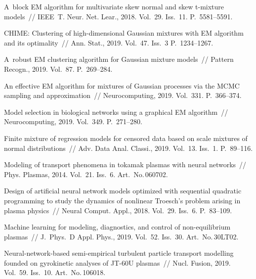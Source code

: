 \begin{multicols}{2}
{{\begin{thebibliography}{99}
A~block EM algorithm for multivariate skew normal and skew t-mixture
models~// IEEE~T. Neur. Net. Lear., 2018. Vol.~29. Iss.~11. P.~5581--5591.

CHIME: Clustering of high-dimensional Gaussian mixtures with EM 
algorithm and its optimality~// Ann. Stat., 2019. Vol.~47. Iss.~3 P.~1234--1267.



A~robust EM clustering algorithm for Gaussian mixture models~// 
Pattern Recogn., 2019. Vol.~87. P.~269--284.

 An effective EM algorithm 
for mixtures of Gaussian processes via the MCMC sampling and approximation~// 
Neurocomputing, 2019. Vol.~331. P.~366--374.
{ %

}

Model selection in biological networks using a graphical EM algorithm~// 
Neurocomputing, 2019. Vol.~349. P.~271--280.

Finite mixture of regression models for censored data based on scale 
mixtures of normal distributions~// Adv. Data Anal. Classi., 2019. Vol.~13. Iss.~1. P.~89--116.

Modeling of transport phenomena in tokamak plasmas with neural networks~// 
Phys. Plasmas, 2014. Vol.~21. Iss.~6. Art.~No.\,060702. %

Design of artificial neural network models optimized with sequential 
quadratic programming to study the dynamics of nonlinear Troesch's 
problem arising in plasma physics~// Neural Comput. 
Appl., 2018. Vol.~29. Iss.~6. P.~83--109. %

Machine learning for modeling, diagnostics, and control 
of non-equilibrium plasmas~// J.~Phys.~D Appl. Phys., 2019. 
Vol.~52. Iss.~30. Art.~No.\,30LT02. %

 Neural-network-based semi-empirical turbulent particle 
transport modelling founded on gyrokinetic analyses of JT-60U plasmas~// 
Nucl. Fusion, 2019. Vol.~59. Iss.~10. Art.~No.\,106018. 


\end{thebibliography}}}
\end{multicols}
